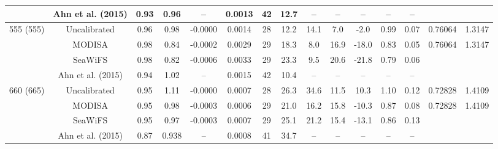 \documentclass[preview]{standalone}
\begin{document}
\begin{tabular}{ccccccccccccccc}
 							& Ahn et al. (2015) & 0.93 & 0.96 & -- & 0.0013 & 42 & 12.7 & -- & -- & -- & -- & -- \\ \hline
\multirow{3}{*}{555 (555)} 	& Uncalibrated 	& 0.96 & 0.98 & -0.0000 & 0.0014 & 28 & 12.2 & 14.1 & 7.0 & -2.0 & 0.99 & 0.07 & 0.76064 & 1.3147\\ 
 							& MODISA 		& 0.98 & 0.84 & -0.0002 & 0.0029 & 29 & 18.3 & 8.0 & 16.9 & -18.0 & 0.83 & 0.05 & 0.76064 & 1.3147\\ 
 							& SeaWiFS 		& 0.98 & 0.82 & -0.0006 & 0.0033 & 29 & 23.3 & 9.5 & 20.6 & -21.8 & 0.79 & 0.06 \\ 
 							& Ahn et al. (2015) & 0.94 & 1.02 & -- & 0.0015 & 42 & 10.4 & -- & -- & -- & -- & -- \\ \hline
\multirow{3}{*}{660 (665)} 	& Uncalibrated 	& 0.95 & 1.11 & -0.0000 & 0.0007 & 28 & 26.3 & 34.6 & 11.5 & 10.3 & 1.10 & 0.12 & 0.72828 & 1.4109\\ 
 							& MODISA 		& 0.95 & 0.98 & -0.0003 & 0.0006 & 29 & 21.0 & 16.2 & 15.8 & -10.3 & 0.87 & 0.08& 0.72828 & 1.4109\\ 
 							& SeaWiFS 		& 0.95 & 0.97 & -0.0003 & 0.0007 & 29 & 25.1 & 21.2 & 15.4 & -13.1 & 0.86 & 0.13 \\ 
 							& Ahn et al. (2015) & 0.87 & 0.938 & -- & 0.0008 & 41 & 34.7 & -- & -- & -- & -- & -- \\ \hline
\end{tabular}
\end{document}
